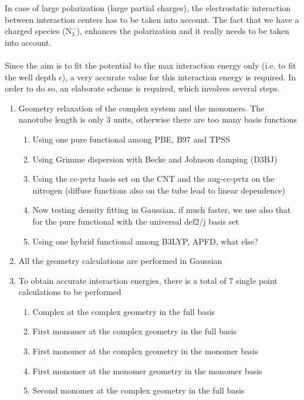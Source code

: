 \documentclass{article}
\begin{document}
%
In case of large polarization (large partial charges), the electrostatic interaction between interaction centers has to be taken into account. The fact that we have a charged species ($\text{N}_3^-$), enhances the polarization and it really needs to be taken into account.\\
\\
Since the aim is to fit the potential to the max interaction energy only (i.e. to fit the well depth $\epsilon$), a very accurate value for this interaction energy is required. In order to do so, an elaborate scheme is required, which involves several steps.\\
%
\begin{enumerate}
    \item Geometry relaxation of the complex system and the monomers. The nanotube length is only 3 units, otherwise there are too many basis functions
    \begin{enumerate}
        \item Using one pure functional among PBE, B97 and TPSS
        \item Using Grimme dispersion with Becke and Johnson damping (D3BJ)
        \item Using the cc-pvtz basis set on the CNT and the aug-cc-pvtz on the nitrogen (diffuse functions also on the tube lead to linear dependence)
        \item Now testing density fitting in Gaussian, if much faster, we use also that for the pure functional with the universal def2/j basis set
        \item Using one hybrid functional among B3LYP, APFD, what else?
    \end{enumerate}
    \item All the geometry calculations are performed in Gaussian
    \item To obtain accurate interaction energies, there is a total of 7 single point calculations to be performed
    \begin{enumerate}
        \item Complex at the complex geometry in the full basis
        \item First monomer at the complex geometry in the full basis
        \item First monomer at the complex geometry in the monomer basis
        \item First monomer at the monomer geometry in the monomer basis
        \item Second monomer at the complex geometry in the full basis

\end{enumerate}
\end{enumerate}
\end{document}
